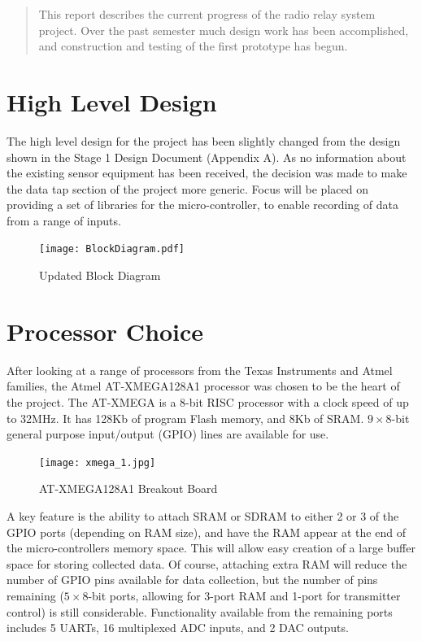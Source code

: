 \documentclass[a4paper,12pt]{article}
\begin{document}
\newpage
 \thispagestyle{empty}
 \vspace*{\fill}
\begin{abstract}
\noindent
This report describes the current progress of the radio relay system project. Over the past semester much design work has been accomplished, and construction and testing of the first prototype has begun. 
\end{abstract}
\vspace*{\fill}
\newpage
\tableofcontents
\newpage



\section{High Level Design}
\label{high_level}
The high level design for the project has been slightly changed from the design shown in the Stage 1 Design Document (Appendix A). As no information about the existing sensor equipment has been received, the decision was made to make the data tap section of the project more generic. Focus will be placed on providing a set of libraries for the micro-controller, to enable recording of data from a range of inputs.

\begin{figure}[h!]
\begin{center}
\texttt{[image: BlockDiagram.pdf]}
\caption{Updated Block Diagram}
\label{new_block_diag}
\end{center}
\end{figure}

\section{Processor Choice}
After looking at a range of processors from the Texas Instruments and Atmel families, the Atmel AT-XMEGA128A1 processor was chosen to be the heart of the project. The AT-XMEGA is a 8-bit RISC processor with a clock speed of up to 32MHz. It has 128Kb of program Flash memory, and 8Kb of SRAM. $9\times 8$-bit general purpose input/output (GPIO) lines are available for use.

\begin{figure}[h]
\begin{center}
\texttt{[image: xmega\_1.jpg]}
\caption{AT-XMEGA128A1 Breakout Board}
\label{xmega_1}
\end{center}
\end{figure}

A key feature is the ability to attach SRAM or SDRAM to either 2 or 3 of the GPIO ports (depending on RAM size), and have the RAM appear at the end of the micro-controllers memory space. This will allow easy creation of a large buffer space for storing collected data. Of course, attaching extra RAM will reduce the number of GPIO pins available for data collection, but the number of pins remaining ($5\times8$-bit ports, allowing for 3-port RAM and 1-port for transmitter control) is still considerable. Functionality available from the remaining ports includes 5 UARTs, 16 multiplexed ADC inputs, and 2 DAC outputs.
\end{document}

